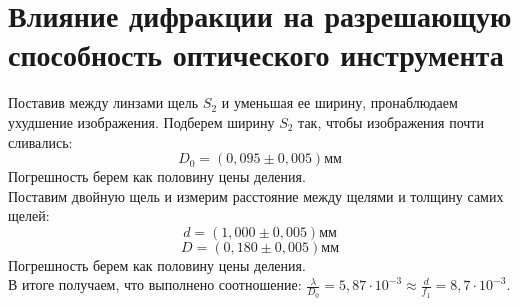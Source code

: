 \documentclass[a4paper,12pt]{extarticle}
\begin{document}
\section{Влияние дифракции на разрешающую способность оптического инструмента}
Поставив между линзами щель $S_2$ и уменьшая ее ширину, пронаблюдаем ухудшение изображения. Подберем ширину $S_2$ так, чтобы изображения почти сливались:
\[D_0 = (0,095 \pm 0,005)\text{мм}\]
Погрешность берем как половину цены деления.\\
Поставим двойную щель и измерим расстояние между щелями и толщину самих щелей: 
\[d = (1,000 \pm 0,005) \text{мм}\]
\[D = (0,180 \pm 0,005) \text{мм}\]
Погрешность берем как половину цены деления.\\
В итоге получаем, что выполнено соотношение:
$\frac{\lambda}{D_0} = 5,87 \cdot 10^{-3} \approx \frac{d}{f_1} = 8,7 \cdot 10^{-3}$.
\end{document}
